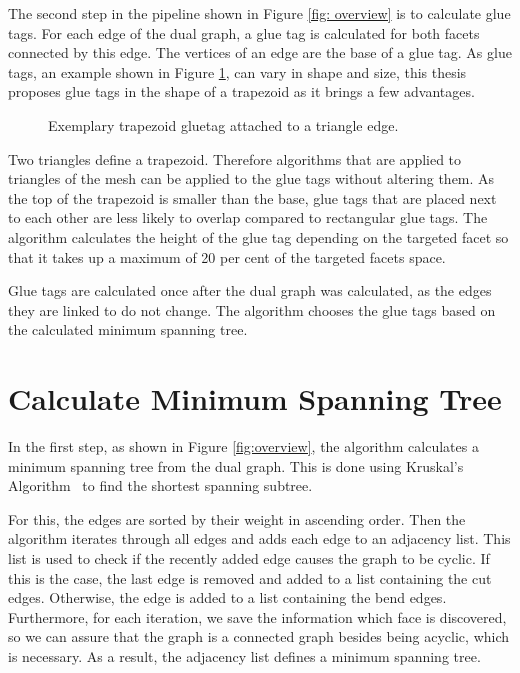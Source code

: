 \documentclass[draft,final]{vutinfth} %
\begin{document}
The second step in the pipeline shown in Figure \ref{fig: overview} is to calculate glue tags. For each edge of the dual graph, a glue tag is calculated for both facets connected by this edge. The vertices of an edge are the base of a glue tag. As glue tags, an example shown in Figure \ref{fig:gluetag}, can vary in shape and size, this thesis proposes glue tags in the shape of a trapezoid as it brings a few advantages. 

\begin{figure}

\caption{Exemplary trapezoid gluetag attached to a triangle edge.}
\label{fig:gluetag}
\end{figure}

Two triangles define a trapezoid. Therefore algorithms that are applied to triangles of the mesh can be applied to the glue tags without altering them. As the top of the trapezoid is smaller than the base, glue tags that are placed next to each other are less likely to overlap compared to rectangular glue tags. The algorithm calculates the height of the glue tag depending on the targeted facet so that it takes up a maximum of 20 per cent of the targeted facets space.

Glue tags are calculated once after the dual graph was calculated, as the edges they are linked to do not change. The algorithm chooses the glue tags based on the calculated minimum spanning tree.

\section{Calculate Minimum Spanning Tree}

In the first step, as shown in Figure \ref{fig:overview}, the algorithm calculates a minimum spanning tree from the dual graph. This is done using Kruskal's Algorithm~\cite{kruskal1956shortest} to find the shortest spanning subtree.

For this, the edges are sorted by their weight in ascending order. Then the algorithm iterates through all edges and adds each edge to an adjacency list. This list is used to check if the recently added edge causes the graph to be cyclic. If this is the case, the last edge is removed and added to a list containing the cut edges. Otherwise, the edge is added to a list containing the bend edges. Furthermore, for each iteration, we save the information which face is discovered, so we can assure that the graph is a connected graph besides being acyclic, which is necessary. As a result, the adjacency list defines a minimum spanning tree.
\end{document}
